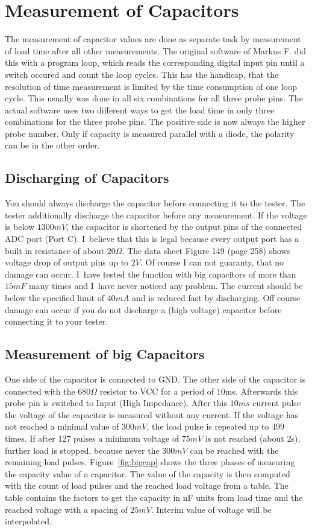 \section{Measurement of Capacitors}
The measurement of capacitor values are done as separate task by measurement of load time
after all other measurements. 
The original software of Markus F. did this with a program loop, which reads the corresponding digital input
pin until a switch occured and count the loop cycles.
This has the handicap, that the resolution of time measurement is limited by the
time consumption of one loop cycle.
This usually was done in all six combinations for all three probe pins. 
The actual software uses two different ways to get the load time in only
three combinations for the three probe pins. The positive side is now always the
higher probe number. Only if capacity is measured parallel with a diode, the
polarity can be in the other order.

\subsection{Discharging of Capacitors}
You should always discharge the capacitor before connecting it to the tester.
The tester additionally discharge the capacitor before any measurement.
If the voltage is below \(1300mV\), the capacitor is shortened by the output pins of the connected ADC port (Port C).
I~believe that this is legal because every output port has a built in resistance of about \(20\Omega\).
The data sheet Figure 149 (page 258) \cite{ATmega8} shows voltage drop of output pins up to \(2V\).
Of course I can not guaranty, that no damage can occur. 
I~have tested the function with big capacitors of more than \(15mF\) many times and I~have never noticed any problem.
The current should be below the specified limit of \(40mA\) and is reduced fast by discharging.
Off course damage can occur if you do not discharge a (high voltage) capacitor before connecting it to your tester.

\subsection{Measurement of big Capacitors}
\label{sec:bigcap}
One side of the capacitor is connected to GND. The other side of the capacitor is connected with the
\(680\Omega\) resistor to VCC for a period of 10ms. Afterwards this probe pin is switched to Input (High Impedance).
After this \(10ms\) current pulse the voltage of the capacitor is measured without any current. If the voltage has not
reached a minimal value of \(300mV\), the load pulse is repeated up to 499 times.
If after 127 pulses a minimum voltage of \(75mV\) is not reached (about 2s), further load is stopped, because never
the \(300mV\) can be reached with the remaining load pulses.
Figure~\ref{fig:bigcap} shows the three phases of measuring the capacity value of a capacitor.
The value of the capacity is then computed with the count of load pulses and the reached load voltage from a table.
The table contains  the factors to get the capacity in nF units from load time and the reached voltage
with a spacing of \(25mV\).
Interim value of voltage will be interpolated.


